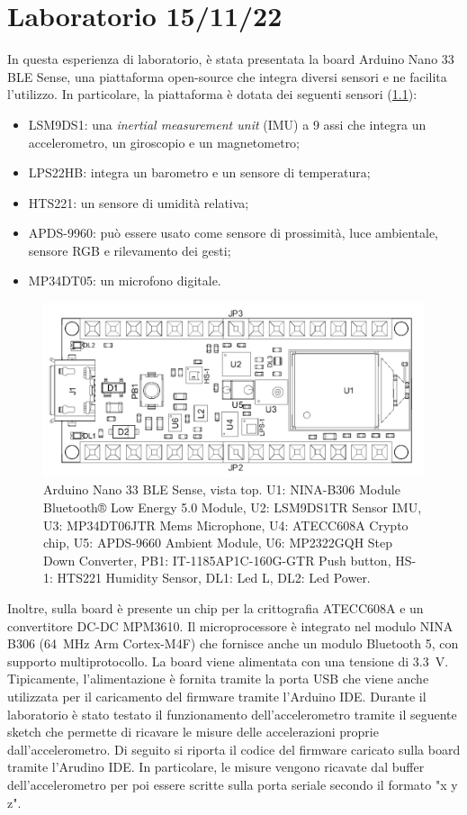 \chapter{Laboratorio 15/11/22}
In questa esperienza di laboratorio, è stata presentata la board Arduino Nano 33 BLE Sense, una piattaforma open-source che integra diversi sensori e ne facilita l'utilizzo. In particolare, la piattaforma è dotata dei seguenti sensori (\Fig\ref{fig:arduino}):
\begin{itemize}
	\item LSM9DS1: una \textit{inertial measurement unit} (IMU) a 9 assi che integra un accelerometro, un giroscopio e un magnetometro;
	\item LPS22HB: integra un barometro e un sensore di temperatura;
	\item HTS221: un sensore di umidità relativa;
	\item APDS-9960: può essere usato come sensore di prossimità, luce ambientale, sensore RGB e rilevamento dei gesti;
	\item MP34DT05: un microfono digitale.
\end{itemize}
\begin{figure}[b!]
	\centering
	\includegraphics[width=0.8\linewidth]{./ImageFiles/arduino.png}
	\caption{Arduino Nano 33 BLE Sense, vista top. U1: NINA-B306 Module Bluetooth® Low Energy 5.0 Module, U2: LSM9DS1TR Sensor IMU, U3: MP34DT06JTR Mems Microphone, U4: ATECC608A Crypto chip, U5: APDS-9660 Ambient Module, U6: MP2322GQH Step Down Converter, PB1: IT-1185AP1C-160G-GTR Push button, HS-1: HTS221 Humidity Sensor, DL1: Led L, DL2: Led Power.}
	\label{fig:arduino}
\end{figure}
Inoltre, sulla board è presente un chip per la crittografia ATECC608A e un convertitore DC-DC MPM3610. Il microprocessore è integrato nel modulo NINA B306 (\SI{64}{\mega\hertz} Arm Cortex-M4F) che fornisce anche un modulo Bluetooth 5, con supporto multiprotocollo. La board viene alimentata con una tensione di \SI{3.3}{\volt}. Tipicamente, l'alimentazione è fornita tramite la porta USB che viene anche utilizzata per il caricamento del firmware tramite l'Arduino IDE.
\newpage
Durante il laboratorio è stato testato il funzionamento dell'accelerometro tramite il seguente sketch che permette di ricavare le misure delle accelerazioni proprie dall'accelerometro. Di seguito si riporta il codice del firmware caricato sulla board tramite l'Arudino IDE. In particolare, le misure vengono ricavate dal buffer dell'accelerometro per poi essere scritte sulla porta seriale secondo il formato "{x} {y} {z}".


